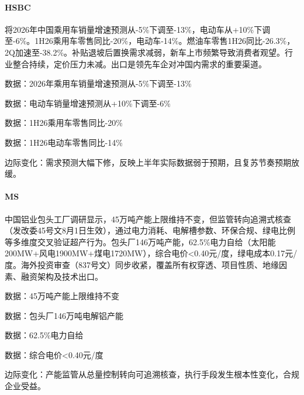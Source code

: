 \documentclass[11pt]{ctexart}
\begin{document}
\paragraph{HSBC} 将2026年中国乘用车销量增速预测从-5\%下调至-13\%，电动车从+10\%下调至-6\%。1H26乘用车零售同比-20\%，电动车-14\%。燃油车零售1H26同比-26.3\%，2Q加速至-38.2\%。补贴退坡后置换需求减弱，新车上市频繁导致消费者观望。行业整合持续，定价压力未减。出口是领先车企对冲国内需求的重要渠道。
{\small\color{refgray}数据：2026年乘用车销量增速预测从-5\%下调至-13\%\par}
{\small\color{refgray}数据：电动车销量增速预测从+10\%下调至-6\%\par}
{\small\color{refgray}数据：1H26乘用车零售同比-20\%\par}
{\small\color{refgray}数据：1H26电动车零售同比-14\%\par}
{\small\color{refgray}边际变化：需求预测大幅下修，反映上半年实际数据弱于预期，且复苏节奏预期放缓。\par}
\paragraph{MS} 中国铝业包头工厂调研显示，45万吨产能上限维持不变，但监管转向追溯式核查（发改委45号文8月1日生效），通过电力消耗、电解槽参数、环保合规、绿电比例等多维度交叉验证超产行为。包头厂146万吨产能，62.5\%电力自给（太阳能200MW+风电1900MW+煤电1720MW），综合电价<0.40元/度，绿电成本0.17元/度。海外投资审查（837号文）同步收紧，覆盖所有权穿透、项目性质、地缘因素、融资架构及技术出口。
{\small\color{refgray}数据：45万吨产能上限维持不变\par}
{\small\color{refgray}数据：包头厂146万吨电解铝产能\par}
{\small\color{refgray}数据：62.5\%电力自给\par}
{\small\color{refgray}数据：综合电价<0.40元/度\par}
{\small\color{refgray}边际变化：产能监管从总量控制转向可追溯核查，执行手段发生根本性变化，合规企业受益。\par}
\end{document}
